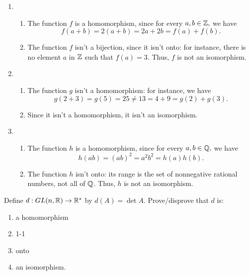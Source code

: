 \begin{solution}[print=true]
\begin{enumerate}

\item \begin{enumerate}
\item
The function $f$ is a homomorphism, since for every $a,b \in
    \mathbb{Z},$ we have
$$f(a+b)=2(a+b)=2a+2b=f(a)+f(b).$$ \item The function $f$ isn't a bijection, since it isn't onto: for instance, there is
no element $a$ in $\mathbb{Z}$ such that $f(a)=3$. Thus, $f$ is not an
isomorphism.
\end{enumerate}


\item \begin{enumerate}
\item The function $g$ isn't a homomorphism: for instance, we have $$g(2+3)=g(5)=25\neq 13=4+9=g(2)+g(3).$$ \item Since it isn't a homomorphism, it isn't an isomorphism.
\end{enumerate}

\item \begin{enumerate}
\item  The function $h$ is a homomorphism, since for every $a,b \in
    \mathbb{Q},$ we have
$$h(ab)=(ab)^2=a^2b^2=h(a)h(b).$$ \item The function $h$ isn't onto: its range is the set of nonnegative rational
numbers, not all of $\mathbb{Q}$. Thus, $h$ is not an isomorphism.
  \end{enumerate}

  \end{enumerate}
\end{solution}

\begin{exercise}
Define $d : GL(n,\mathbb{R})\to \mathbb{R}^*$ by $d(A)=\det A$.  Prove/disprove that $d$ is:

  \begin{enumerate}
\item a homomorphism
\item 1-1
\item onto
\item an isomorphism.
  \end{enumerate}
\end{exercise}

